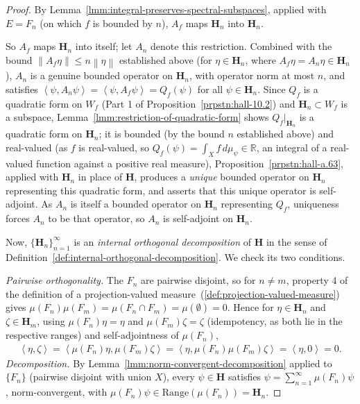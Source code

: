 \begin{proof}
By Lemma~\ref{lmm:integral-preserves-spectral-subspaces}, applied with $E = F_n$ (on which $f$ is bounded by $n$), $A_f$ maps $\mathbf{H}_n$ into $\mathbf{H}_n$.

So $A_f$ maps $\mathbf{H}_n$ into itself; let $A_n$ denote this restriction. Combined with the bound $\left\| A_f \eta \right\| \le n \left\| \eta \right\|$ established above (for $\eta \in \mathbf{H}_n$, where $A_f\eta = A_n\eta \in \mathbf{H}_n$), $A_n$ is a genuine bounded operator on $\mathbf{H}_n$, with operator norm at most $n$, and satisfies $\left< \psi, A_n\psi \right> = \left< \psi, A_f\psi \right> = Q_f(\psi)$ for all $\psi \in \mathbf{H}_n$. Since $Q_f$ is a quadratic form on $W_f$ (Part 1 of Proposition~\ref{prpstn:hall-10.2}) and $\mathbf{H}_n \subset W_f$ is a subspace, Lemma~\ref{lmm:restriction-of-quadratic-form} shows $Q_f\vert_{\mathbf{H}_n}$ is a quadratic form on $\mathbf{H}_n$; it is bounded (by the bound $n$ established above) and real-valued (as $f$ is real-valued, so $Q_f(\psi) = \int_X f \, d\mu_\psi \in \mathbb{R}$, an integral of a real-valued function against a positive real measure), Proposition~\ref{prpstn:hall-a.63}, applied with $\mathbf{H}_n$ in place of $\mathbf{H}$, produces a \textit{unique} bounded operator on $\mathbf{H}_n$ representing this quadratic form, and asserts that this unique operator is self-adjoint. As $A_n$ is itself a bounded operator on $\mathbf{H}_n$ representing $Q_f$, uniqueness forces $A_n$ to be that operator, so $A_n$ is self-adjoint on $\mathbf{H}_n$.

Now, $\{ \mathbf{H}_n \}_{n=1}^\infty$ is an \textit{internal orthogonal decomposition} of $\mathbf{H}$ in the sense of Definition~\ref{def:internal-orthogonal-decomposition}. We check its two conditions.

\textit{Pairwise orthogonality.} The $F_n$ are pairwise disjoint, so for $n \ne m$, property 4 of the definition of a projection-valued measure~(\ref{def:projection-valued-measure}) gives $\mu(F_n)\mu(F_m) = \mu(F_n \cap F_m) = \mu(\emptyset) = 0$. Hence for $\eta \in \mathbf{H}_n$ and $\zeta \in \mathbf{H}_m$, using $\mu(F_n)\eta = \eta$ and $\mu(F_m)\zeta = \zeta$ (idempotency, as both lie in the respective ranges) and self-adjointness of $\mu(F_n)$,
\begin{align}
    \left< \eta, \zeta \right> = \left< \mu(F_n)\eta, \mu(F_m)\zeta \right> = \left< \eta, \mu(F_n)\mu(F_m)\zeta \right> = \left< \eta, 0 \right> = 0.
\end{align}
\textit{Decomposition.} By Lemma~\ref{lmm:norm-convergent-decomposition} applied to $\{F_n\}$ (pairwise disjoint with union $X$), every $\psi \in \mathbf{H}$ satisfies $\psi = \sum_{n=1}^\infty \mu(F_n)\psi$, norm-convergent, with $\mu(F_n)\psi \in \text{Range}(\mu(F_n)) = \mathbf{H}_n$.


\end{proof}
